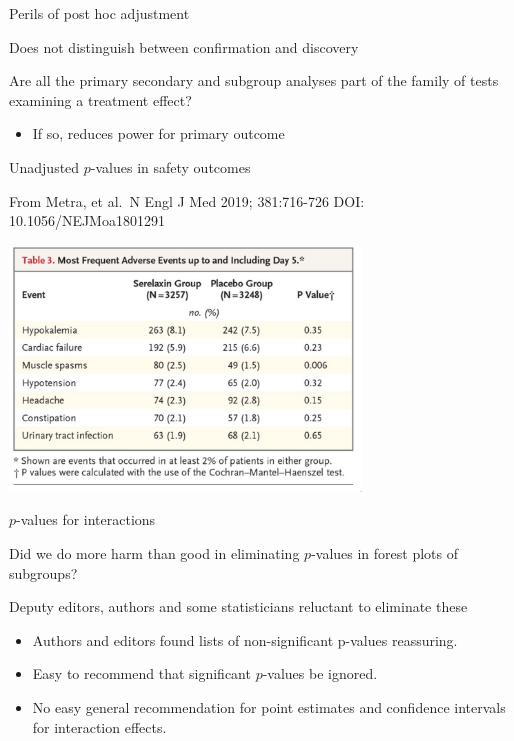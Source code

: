 \documentclass[ignorenonframetext,]{beamer}
\providecommand{\tightlist}{%
  \setlength{\itemsep}{0pt}\setlength{\parskip}{0pt}}
\begin{document}
\begin{frame}{Perils of post hoc adjustment}
\protect\hypertarget{perils-of-post-hoc-adjustment}{}

Does not distinguish between confirmation and discovery

Are all the primary secondary and subgroup analyses part of the family
of tests examining a treatment effect?

\begin{itemize}
\tightlist
\item
  If so, reduces power for primary outcome
\end{itemize}

\end{frame}

\begin{frame}{Unadjusted \(p\)-values in safety outcomes}
\protect\hypertarget{unadjusted-p-values-in-safety-outcomes}{}

From Metra, et al.~N Engl J Med 2019; 381:716-726 DOI:
10.1056/NEJMoa1801291

\centering

\includegraphics[width=0.7\textwidth,height=\textheight]{../figures/safety_p-values.jpeg}

\end{frame}

\begin{frame}{\(p\)-values for interactions}
\protect\hypertarget{p-values-for-interactions}{}

Did we do more harm than good in eliminating \(p\)-values in forest
plots of subgroups?

Deputy editors, authors and some statisticians reluctant to eliminate
these

\begin{itemize}
\item
  Authors and editors found lists of non-significant p-values
  reassuring.
\item
  Easy to recommend that significant \(p\)-values be ignored.
\item
  No easy general recommendation for point estimates and confidence
  intervals for interaction effects.
\end{itemize}

\end{frame}
\end{document}
